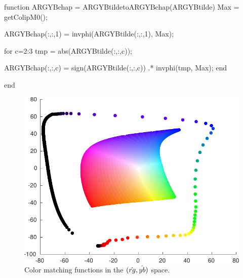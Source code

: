 \begin{matlab}
function ARGYBchap = ARGYBtildetoARGYBchap(ARGYBtilde)
Max = getColipM0();

ARGYBchap(:,:,1) = invphi(ARGYBtilde(:,:,1), Max); 

for c=2:3
    tmp =  abs(ARGYBtilde(:,:,c));

    ARGYBchap(:,:,c) = sign(ARGYBtilde(:,:,c)) .* invphi(tmp, Max);
end

end
\end{matlab}


\begin{figure}[htbp]
	\centering
	\includegraphics[width=.8\linewidth]{argyb.pdf}
	\caption{Color matching functions in the $(\mathop{\hat{rg}}\nolimits,\mathop{\hat{yb}}\nolimits)$ space.}
	\label{fig:colip:matlab:rgyb}
\end{figure}
